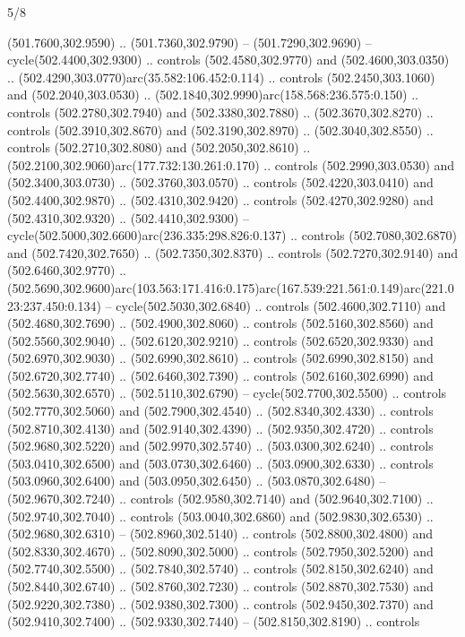 \begin{flagdescription}{5/8}
\begin{scope}[xshift=0.5\flaglength,yshift=0.5\flagwidth,scale=\flagwidth/475.63]
\begin{scope}[y=0.8pt, x=0.8pt, yscale=-1, xscale=1,shift={(-450,-300)}]
\begin{scope}[cm={{1.0,0.0,0.0,1.0,(-0.0002,0.12556)}},cm={{1.0,0.0,0.0,1.0,(0.00179,0.0)}}]
\begin{scope}[cm={{1.11592,0.0,0.0,1.11592,(-106.89933,-41.77764)}}]
\begin{scope}[draw=black,fill=cfff]
\begin{scope}[fill=black]
  (501.7600,302.9590) .. (501.7360,302.9790) -- (501.7290,302.9690) --
  cycle(502.4400,302.9300) .. controls (502.4580,302.9770) and
  (502.4600,303.0350) .. (502.4290,303.0770)arc(35.582:106.452:0.114) ..
  controls (502.2450,303.1060) and (502.2040,303.0530) ..
  (502.1840,302.9990)arc(158.568:236.575:0.150) .. controls (502.2780,302.7940)
  and (502.3380,302.7880) .. (502.3670,302.8270) .. controls (502.3910,302.8670)
  and (502.3190,302.8970) .. (502.3040,302.8550) .. controls (502.2710,302.8080)
  and (502.2050,302.8610) .. (502.2100,302.9060)arc(177.732:130.261:0.170) ..
  controls (502.2990,303.0530) and (502.3400,303.0730) .. (502.3760,303.0570) ..
  controls (502.4220,303.0410) and (502.4400,302.9870) .. (502.4310,302.9420) ..
  controls (502.4270,302.9280) and (502.4310,302.9320) .. (502.4410,302.9300) --
  cycle(502.5000,302.6600)arc(236.335:298.826:0.137) .. controls
  (502.7080,302.6870) and (502.7420,302.7650) .. (502.7350,302.8370) .. controls
  (502.7270,302.9140) and (502.6460,302.9770) ..
  (502.5690,302.9600)arc(103.563:171.416:0.175)arc(167.539:221.561:0.149)arc(221.023:237.450:0.134)
  -- cycle(502.5030,302.6840) .. controls (502.4600,302.7110) and
  (502.4680,302.7690) .. (502.4900,302.8060) .. controls (502.5160,302.8560) and
  (502.5560,302.9040) .. (502.6120,302.9210) .. controls (502.6520,302.9330) and
  (502.6970,302.9030) .. (502.6990,302.8610) .. controls (502.6990,302.8150) and
  (502.6720,302.7740) .. (502.6460,302.7390) .. controls (502.6160,302.6990) and
  (502.5630,302.6570) .. (502.5110,302.6790) -- cycle(502.7700,302.5500) ..
  controls (502.7770,302.5060) and (502.7900,302.4540) .. (502.8340,302.4330) ..
  controls (502.8710,302.4130) and (502.9140,302.4390) .. (502.9350,302.4720) ..
  controls (502.9680,302.5220) and (502.9970,302.5740) .. (503.0300,302.6240) ..
  controls (503.0410,302.6500) and (503.0730,302.6460) .. (503.0900,302.6330) ..
  controls (503.0960,302.6400) and (503.0950,302.6450) .. (503.0870,302.6480) --
  (502.9670,302.7240) .. controls (502.9580,302.7140) and (502.9640,302.7100) ..
  (502.9740,302.7040) .. controls (503.0040,302.6860) and (502.9830,302.6530) ..
  (502.9680,302.6310) -- (502.8960,302.5140) .. controls (502.8800,302.4800) and
  (502.8330,302.4670) .. (502.8090,302.5000) .. controls (502.7950,302.5200) and
  (502.7740,302.5500) .. (502.7840,302.5740) .. controls (502.8150,302.6240) and
  (502.8440,302.6740) .. (502.8760,302.7230) .. controls (502.8870,302.7530) and
  (502.9220,302.7380) .. (502.9380,302.7300) .. controls (502.9450,302.7370) and
  (502.9410,302.7400) .. (502.9330,302.7440) -- (502.8150,302.8190) .. controls

\end{scope}
\end{scope}
\end{scope}
\end{scope}
\end{scope}
\end{scope}
\end{flagdescription}
